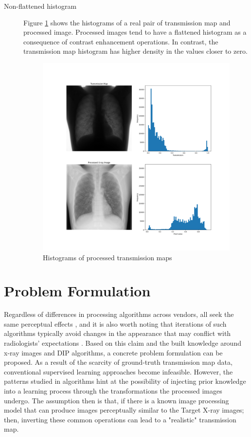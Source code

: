\documentclass[nomenclature, english, bibtex]{kththesis}
\numberwithin{listing}{chapter}
\begin{document}
\begin{description}
    \item[Non-flattened histogram] Figure \ref{fig:processedHistogramCompare} shows the histograms of a real pair of transmission map
    and processed image. Processed images tend to have a flattened histogram as a consequence of
    contrast enhancement operations. In contrast, the transmission map histogram has higher
    density in the values closer to zero.
    \begin{figure}[H]
        \centering
        \includegraphics[width=1.0\textwidth]{figures/processed_hist_cmp.png}
        \caption{Histograms of processed transmission maps}
        \label{fig:processedHistogramCompare}
    \end{figure}
\end{description}


\chapter{Problem Formulation}


Regardless of differences in processing algorithms across vendors, all seek the same perceptual effects
\cite[p.~119]{carterDigitalRadiographyPACS2010}, and it is also worth noting that iterations of such algorithms typically
avoid changes in the appearance that may conflict with radiologists' expectations \cite[p.~57]{STA00a}.
Based on this claim and the built knowledge around x-ray images and \acrfull{DIP} algorithms, a concrete problem
formulation can be proposed. As a result of the scarcity of ground-truth transmission map data, conventional supervised learning
approaches become infeasible. However, the patterns studied in  algorithms hint at the possibility
of injecting prior knowledge into a learning process through the transformations the processed images undergo.
The assumption then is that, if there is a known image processing model that can produce images perceptually similar to the
Target X-ray images; then, inverting these common operations can lead to a "realistic" transmission map.
\end{document}
